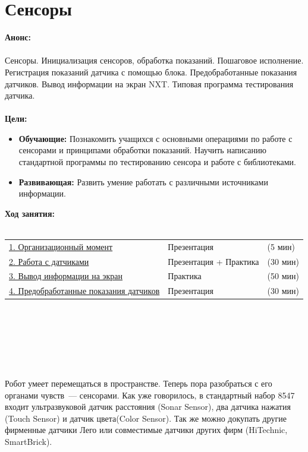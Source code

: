 \chapter{\label{lesson14}Сенсоры}
{\bfseries Анонс:}\\\\
Сенсоры. Инициализация сенсоров, обработка показаний. Пошаговое исполнение. Регистрация показаний датчика с помощью блока. Предобработанные показания датчиков. Вывод информации на экран NXT. Типовая программа тестирования датчика.\\\\
{\bfseries Цели:}
\begin{itemize}
	\item{}{\bfseries Обучающие:} Познакомить учащихся с основными операциями по работе с сенсорами и принципами обработки показаний. Научить написанию стандартной программы по тестированию сенсора и работе с библиотеками.
	\item{}{\bfseries Развивающая:} Развить умение работать с различными источниками информации.\\
\end{itemize}	
{\bfseries Ход занятия:}\\\\
\begin{tabular}{lll}
	\hyperlink{lesson14x1}{1. Организационный момент} & Презентация & (5 мин)\\
	\hyperlink{lesson14x2}{2. Работа с датчиками} & Презентация + Практика & (30 мин) \\
	\hyperlink{lesson14x3}{3. Вывод информации на экран} & Практика & (50 мин) \\
	\hyperlink{lesson14x4}{4. Предобработанные показания датчиков} & Презентация & (30 мин) \\
\end{tabular}\\\\

{\hypertarget{lesson14x1}{}}\\\\
\clearpage
{\hypertarget{lesson14x1}{}}\\\\ 

Робот умеет перемещаться в пространстве. Теперь пора разобраться с его органами чувств~--- сенсорами. Как уже говорилось, в стандартный набор 8547 входит ультразвуковой датчик расстояния (Sonar Sensor), два датчика нажатия (Touch Sensor)  и датчик цвета(Color Sensor). Так же можно докупать другие фирменные датчики Лего или совместимые датчики других фирм (HiTechnic, SmartBrick).

